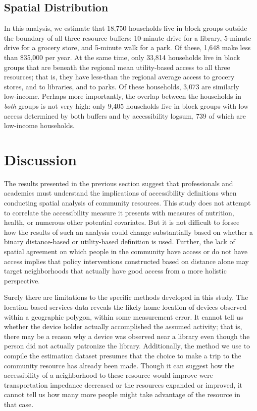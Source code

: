 \documentclass[ijerph,article,submit,moreauthors,pdftex]{mdpi}
\begin{document}
\hypertarget{spatial-distribution}{%
\subsection{Spatial Distribution}\label{spatial-distribution}}

In this analysis,
we estimate that 18,750 households live in block groups outside the
boundary of all three resource buffers: 10-minute drive for a library, 5-minute drive for
a grocery store, and 5-minute walk for a park. Of these, 1,648 make less
than \$35,000 per year.
At the same time, only 33,814 households
live in block groups that are beneath the regional mean utility-based access to
all three resources; that is, they have less-than the regional average access to
grocery stores, and to libraries, and to parks. Of these households, 3,073
are similarly low-income. Perhaps more importantly, the overlap between the households
in \emph{both} groups is not very high: only 9,405 households live
in block groups with low access determined by both buffers and by accessibility
logsum, 739 of which are low-income households.

\hypertarget{discussion}{%
\section{Discussion}\label{discussion}}

The results presented in the previous section suggest that professionals and
academics must understand the implications of accessibility definitions when
conducting spatial analysis of community resources. This study does not attempt
to correlate the accessibility measure it presents with measures of nutrition,
health, or numerous other potential covariates. But it is not difficult to forsee
how the results of such an analysis could change substantially based on whether a
binary distance-based or utility-based definition is used. Further, the lack of
spatial agreement on which people in the community have access or do not have access
implies that policy interventions constructed based on distance alone may target
neighborhoods that actually have good access from a more holistic perspective.

Surely there are limitations to the specific methods developed in this study.
The location-based services data
reveals the likely home location of devices observed within a geographic
polygon, within some measurement error. It cannot tell us whether the device
holder actually accomplished the assumed activity; that is, there may be a
reason why a device was observed near a library even though the person did not
actually patronize the library. Additionally, the method we use to compile the
estimation dataset presumes that the choice to make a trip to the community
resource has already been made. Though it can suggest how the accessibility of a
neighborhood to these resource would improve were transportation impedance
decreased or the resources expanded or improved, it cannot tell us how many more
people might take advantage of the resource in that case.
\end{document}
